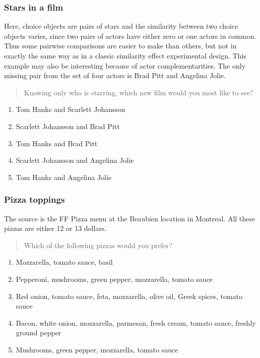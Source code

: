 \documentclass[11pt,letter]{amsart}
\begin{document}
\subsubsection{Stars in a film}

Here, choice objects are pairs of stars and the similarity between two choice objects varies, since two pairs of actors have either zero or one actors in common.
Thus some pairwise comparisons are easier to make than others, but not in exactly the same way as in a classic similarity effect experimental design.
This example may also be interesting because of actor complementarities.
The only missing pair from the set of four actors is Brad Pitt and Angelina Jolie.

\begin{quotation}
Knowing only who is starring, which new film would you most like to see?
\end{quotation}

\begin{enumerate}
\item Tom Hanks and Scarlett Johansson 

\item Scarlett Johansson and Brad Pitt 

\item Tom Hanks and Brad Pitt 

\item Scarlett Johansson and Angelina Jolie 

\item Tom Hanks and Angelina Jolie
\end{enumerate}

\subsubsection{Pizza toppings}

The source is the FF Pizza menu at the Beaubien location in Montreal. All
these pizzas are either 12 or 13 dollars.

\begin{quotation}
Which of the following pizzas would you prefer?
\end{quotation}

\begin{enumerate}
\item Mozzarella, tomato sauce, basil 

\item Pepperoni, mushrooms, green pepper, mozzarella, tomato sauce 

\item Red onion, tomato sauce, feta, mozzarella, olive oil, Greek spices,
tomato sauce 

\item Bacon, white onion, mozzarella, parmesan, fresh cream, tomato sauce,
freshly ground pepper 

\item Mushrooms, green pepper, mozzarella, tomato sauce
\end{enumerate}
\end{document}
